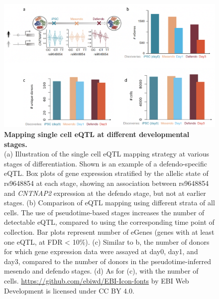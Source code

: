 \begin{figure}[h]
\centering
\includegraphics[width=14cm]{Chapter4/Fig/endodiff_eqtl.png}
\caption[eQTL maps of iPSC, mesendo, defendo]{\textbf{Mapping single cell eQTL at different developmental stages.}\\
(a) Illustration of the single cell eQTL mapping strategy at various stages of differentiation.
Shown is an example of a defendo-specific eQTL. 
Box plots of gene expression stratified by the allelic state of
rs9648854 at each stage, showing an association between rs9648854 and \textit{CNTNAP2} expression at the defendo stage, but not at earlier stages. 
(b) Comparison of eQTL mapping using different strata of all cells.
The use of pseudotime-based stages increases the number of detectable eQTL, compared to using the corresponding time point of collection.
Bar plots represent number of eGenes (genes with at least one eQTL, at FDR < 10\%).
(c) Similar to b, the number of donors for which gene expression data were assayed at day0, day1, and day3, compared to the number of donors in the pseudotime-inferred mesendo and defendo stages.
(d) As for (c), with the number of cells.
\url{https://github.com/ebiwd/EBI-Icon-fonts} by EBI Web Development is licensed under CC BY 4.0. }
\label{fig:endodiff_stage_eqtl}
\end{figure}

